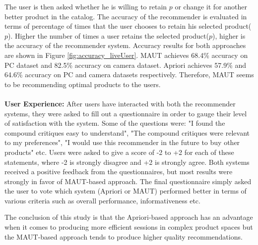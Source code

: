 The user is then asked whether he is willing to retain $p$  or change it for another better product in the catalog.
The accuracy of the recommender is evaluated in terms of percentage of times that the user chooses to retain his selected product($p$).
Higher the number of times a user retains the selected product($p$), higher is the accuracy of the recommender system.
Accuracy results for both approaches are shown in Figure \ref{fig:accuracy_liveUser}.
MAUT achieves 68.4\% accuracy on PC dataset and 82.5\% accuracy on camera dataset.
Apriori achieves 57.9\% and 64.6\% accuracy on PC and camera datasets respectively.
Therefore, MAUT seems to be recommending optimal products to the users. \\
\\
\textbf{User Experience:}
After users have interacted with both the recommender systems, they were asked to fill out a questionnaire in order to gauge their level of satisfaction with the system.
Some of the questions were: "I found the compound critiques easy to understand", "The compound critiques were relevant to my preferences", "I would use this recommender in the future to buy other products" etc.
Users were asked to give a score of -2 to +2 for each of these statements, where -2 is strongly disagree and +2 is strongly agree.
Both systems received a positive feedback from the questionnaires, but most results were strongly in favor of MAUT-based approach.
The final questionnaire simply asked the user to vote which system (Apriori or MAUT) performed better in terms of various criteria such as overall performance, informativeness etc. 

The conclusion of this study is that the Apriori-based approach has an advantage when it comes to producing more efficient sessions in complex product spaces but the MAUT-based approach tends to produce higher quality recommendations. 

